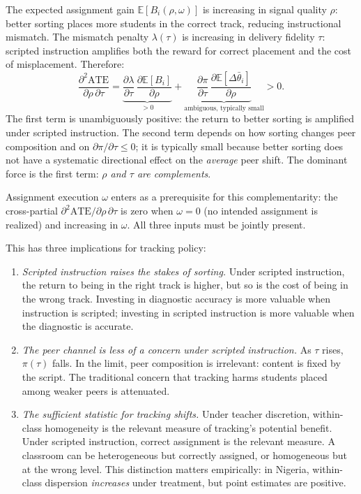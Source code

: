 \documentclass[11pt]{article}
\newcommand{\E}{\mathbb{E}}
\begin{document}
The expected assignment gain $\E[B_i(\rho,\omega)]$ is increasing in signal quality $\rho$: better sorting places more students in the correct track, reducing instructional mismatch. The mismatch penalty $\lambda(\tau)$ is increasing in delivery fidelity $\tau$: scripted instruction amplifies both the reward for correct placement and the cost of misplacement. Therefore:
\begin{equation}
\label{eq:complementarity}
\frac{\partial^2 \text{ATE}}{\partial \rho \, \partial \tau} = \underbrace{\frac{\partial \lambda}{\partial \tau}\,\frac{\partial \E[B_i]}{\partial \rho}}_{> 0} + \underbrace{\frac{\partial \pi}{\partial \tau}\,\frac{\partial \E[\Delta\bar{\theta}_i]}{\partial \rho}}_{\text{ambiguous, typically small}} > 0.
\end{equation}
The first term is unambiguously positive: the return to better sorting is amplified under scripted instruction. The second term depends on how sorting changes peer composition and on $\partial\pi/\partial\tau \leq 0$; it is typically small because better sorting does not have a systematic directional effect on the \emph{average} peer shift. The dominant force is the first term: \emph{$\rho$ and $\tau$ are complements}.

Assignment execution $\omega$ enters as a prerequisite for this complementarity: the cross-partial $\partial^2\text{ATE}/\partial\rho\,\partial\tau$ is zero when $\omega = 0$ (no intended assignment is realized) and increasing in $\omega$. All three inputs must be jointly present.

This has three implications for tracking policy:

\begin{enumerate}
\item \emph{Scripted instruction raises the stakes of sorting.} Under scripted instruction, the return to being in the right track is higher, but so is the cost of being in the wrong track. Investing in diagnostic accuracy is more valuable when instruction is scripted; investing in scripted instruction is more valuable when the diagnostic is accurate.

\item \emph{The peer channel is less of a concern under scripted instruction.} As $\tau$ rises, $\pi(\tau)$ falls. In the limit, peer composition is irrelevant: content is fixed by the script. The traditional concern that tracking harms students placed among weaker peers is attenuated.

\item \emph{The sufficient statistic for tracking shifts.} Under teacher discretion, within-class homogeneity is the relevant measure of tracking's potential benefit. Under scripted instruction, correct assignment is the relevant measure. A classroom can be heterogeneous but correctly assigned, or homogeneous but at the wrong level. This distinction matters empirically: in Nigeria, within-class dispersion \emph{increases} under treatment, but point estimates are positive.
\end{enumerate}
\end{document}
